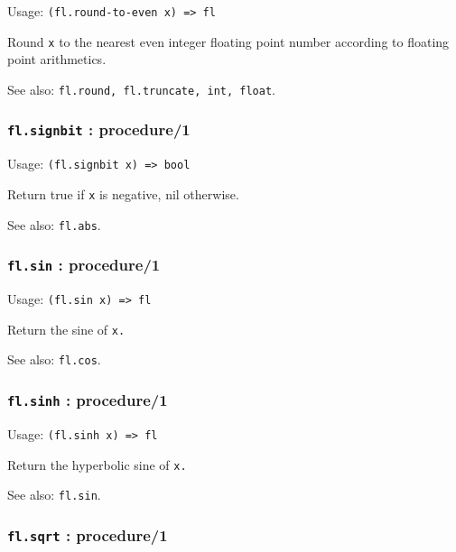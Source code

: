 \documentclass[
]{article}
\newcommand{\passthrough}[1]{#1}
\begin{document}
Usage: \passthrough{\lstinline!(fl.round-to-even x) => fl!}

Round \passthrough{\lstinline!x!} to the nearest even integer floating
point number according to floating point arithmetics.

See also: \passthrough{\lstinline!fl.round, fl.truncate, int, float!}.

\hypertarget{fl.signbit-procedure1}{%
\subsubsection{\texorpdfstring{\texttt{fl.signbit} :
procedure/1}{fl.signbit : procedure/1}}\label{fl.signbit-procedure1}}

Usage: \passthrough{\lstinline!(fl.signbit x) => bool!}

Return true if \passthrough{\lstinline!x!} is negative, nil otherwise.

See also: \passthrough{\lstinline!fl.abs!}.

\hypertarget{fl.sin-procedure1}{%
\subsubsection{\texorpdfstring{\texttt{fl.sin} :
procedure/1}{fl.sin : procedure/1}}\label{fl.sin-procedure1}}

Usage: \passthrough{\lstinline!(fl.sin x) => fl!}

Return the sine of \passthrough{\lstinline!x.!}

See also: \passthrough{\lstinline!fl.cos!}.

\hypertarget{fl.sinh-procedure1}{%
\subsubsection{\texorpdfstring{\texttt{fl.sinh} :
procedure/1}{fl.sinh : procedure/1}}\label{fl.sinh-procedure1}}

Usage: \passthrough{\lstinline!(fl.sinh x) => fl!}

Return the hyperbolic sine of \passthrough{\lstinline!x.!}

See also: \passthrough{\lstinline!fl.sin!}.

\hypertarget{fl.sqrt-procedure1}{%
\subsubsection{\texorpdfstring{\texttt{fl.sqrt} :
procedure/1}{fl.sqrt : procedure/1}}\label{fl.sqrt-procedure1}}
\end{document}
